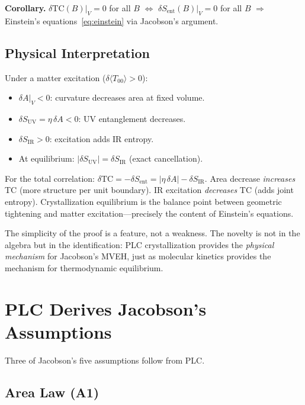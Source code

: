 \documentclass[aps,pra,twocolumn,superscriptaddress,floatfix]{revtex4-2}
\begin{document}
\textbf{Corollary.}
$\delta\mathrm{TC}(B)|_V = 0$ for all $B$ $\Leftrightarrow$ $\delta S_{\mathrm{ent}}(B)|_V = 0$ for all $B$ $\Rightarrow$ Einstein's equations~\eqref{eq:einstein} via Jacobson's argument.

\subsection{Physical Interpretation}

Under a matter excitation ($\delta\langle T_{00}\rangle > 0$):
\begin{itemize}
\item $\delta A|_V < 0$: curvature decreases area at fixed volume.
\item $\delta S_{\mathrm{UV}} = \eta \, \delta A < 0$: UV entanglement decreases.
\item $\delta S_{\mathrm{IR}} > 0$: excitation adds IR entropy.
\item At equilibrium: $|\delta S_{\mathrm{UV}}| = \delta S_{\mathrm{IR}}$ (exact cancellation).
\end{itemize}

For the total correlation: $\delta\mathrm{TC} = -\delta S_{\mathrm{ent}} = |\eta \, \delta A| - \delta S_{\mathrm{IR}}$.
Area decrease \emph{increases} TC (more structure per unit boundary).
IR excitation \emph{decreases} TC (adds joint entropy).
Crystallization equilibrium is the balance point between geometric tightening and matter excitation---precisely the content of Einstein's equations.

The simplicity of the proof is a feature, not a weakness.
The novelty is not in the algebra but in the identification:
PLC crystallization provides the \emph{physical mechanism} for Jacobson's MVEH,
just as molecular kinetics provides the mechanism for thermodynamic equilibrium.


\section{PLC Derives Jacobson's Assumptions}
\label{sec:derives}

Three of Jacobson's five assumptions follow from PLC.

\subsection{Area Law (A1)}
\end{document}
